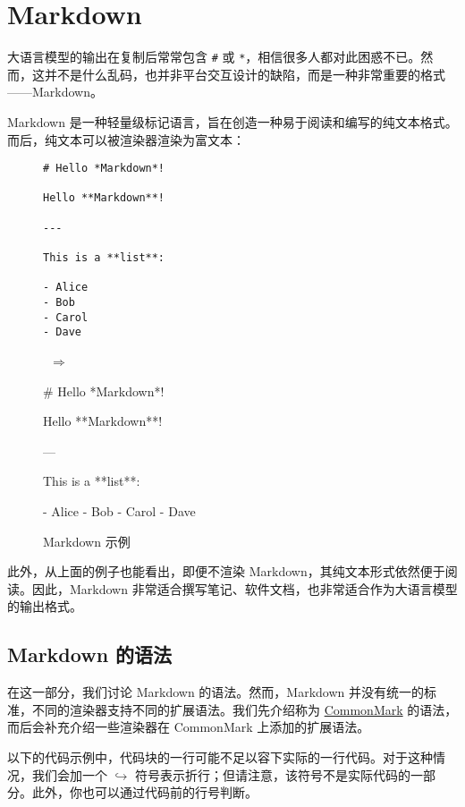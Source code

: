 \documentclass[a4paper,fontset=none]{ctexart}
\begin{document}
\section{Markdown}

大语言模型的输出在复制后常常包含 \verb|#| 或 \verb|*|，相信很多人都对此困惑不已。然而，这并不是什么乱码，也并非平台交互设计的缺陷，而是一种非常重要的格式——Markdown。

Markdown 是一种轻量级标记语言，旨在创造一种易于阅读和编写的纯文本格式。而后，纯文本可以被渲染器渲染为富文本：

\begin{figure}[H]
    \centering
    \begin{minipage}{0.45\textwidth}
        \begin{verbatim}
# Hello *Markdown*!

Hello **Markdown**!

---

This is a **list**:

- Alice
- Bob
- Carol
- Dave
        \end{verbatim}
    \end{minipage}
    \, $\Longrightarrow$ \,
    \begin{minipage}{0.45\textwidth}
\begin{markdown}
# Hello *Markdown*!

Hello **Markdown**!

---

This is a **list**:

- Alice
- Bob
- Carol
- Dave
\end{markdown}
    \end{minipage}
    \caption{Markdown 示例}
\end{figure}

此外，从上面的例子也能看出，即便不渲染 Markdown，其纯文本形式依然便于阅读。因此，Markdown 非常适合撰写笔记、软件文档，也非常适合作为大语言模型的输出格式。

\subsection{Markdown 的语法}

在这一部分，我们讨论 Markdown 的语法。然而，Markdown 并没有统一的标准，不同的渲染器支持不同的扩展语法。我们先介绍称为 \href{https://commonmark.org/}{CommonMark} 的语法，而后会补充介绍一些渲染器在 CommonMark 上添加的扩展语法。

以下的代码示例中，代码块的一行可能不足以容下实际的一行代码。对于这种情况，我们会加一个 $\hookrightarrow$ 符号表示折行；但请注意，该符号不是实际代码的一部分。此外，你也可以通过代码前的行号判断。
\end{document}
